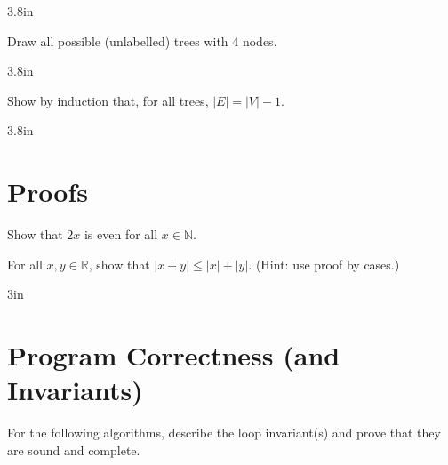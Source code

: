 \documentclass[solutionorbox, answers]{exam}
\begin{document}
\begin{questions}
\begin{solutionbox}{3.8in}
\end{solutionbox}

\question
Draw all possible (unlabelled) trees with 4 nodes.

\begin{solutionbox}{3.8in}
\end{solutionbox}

\question
Show by induction that, for all trees, $|E| = |V| - 1$.

\begin{solutionbox}{3.8in}
\end{solutionbox}

\section*{Proofs}
\label{sec:proofs}

\question
Show that $2x$ is even for all $x \in \mathbb{N}$.


\question
For all $x,y \in \mathbb{R}$, show that $|x + y| \le |x| + |y|$. (Hint: use proof by cases.)
\begin{solutionbox}{3in}
\end{solutionbox}

\section*{Program Correctness (and Invariants)}
\label{sec:program-correctness}

\question
For the following algorithms, describe the loop invariant(s) and prove that they are sound and complete.
\begin{parts}

\end{parts}
\end{questions}
\end{document}
